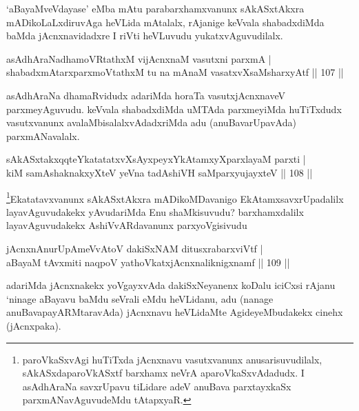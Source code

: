 \begin{artha}
`aBayaMveVdayase' eMba mAtu parabarxhamxvanunx sAkASxtAkxra mADikoLaLxdiruvAga heVLida mAtalalx, rAjanige keVvala shabadxdiMda baMda jAcnxnavidadxre I riVti heVLuvudu yukatxvAguvudilalx.
\end{artha}

\begin{shl}
asAdhAraNadhamoVRtathxM vijAcnxnaM vasutxni parxmA |\\
shabadxmAtarxparxmoVtathxM tu na mAnaM vasatxvXsaMsharxyAtf \hfill || 107 || 
\end{shl}

\begin{artha}
asAdhAraNa dhamaRvidudx adariMda horaTa vasutxjAcnxnaveV parxmeyAguvudu. keVvala shabadxdiMda uMTAda parxmeyiMda huTiTxdudx vasutxvanunx avalaMbisalalxvAdadxriMda adu (anuBavarUpavAda) parxmANavalalx.
\end{artha}

\begin{shl}
sAkASxtakxqqteYkatatatxvXsAyxpeyxYkAtamxyXparxlayaM parxti |\\
kiM samAshaknakxyXteV yeVna tadAshiVH saMparxyujayxteV \hfill || 108 || 
\end{shl}

\begin{artha}
\footnote{paroVkaSxvAgi huTiTxda jAcnxnavu vasutxvanunx anusarisuvudilalx, sAkASxdaparoVkASxtf barxhamx neVrA aparoVkaSxvAdadudx. I asAdhAraNa savxrUpavu tiLidare adeV anuBava parxtayxkaSx parxmANavAguvudeMdu tAtapxyaR.}Ekatatavxvanunx sAkASxtAkxra mADikoMDavanigo EkAtamxsavxrUpadalilx layavAguvudakekx yAvudariMda Enu shaMkisuvudu? barxhamxdalilx layavAguvudakekx AshiVvARdavanunx parxyoVgisivudu
\end{artha}

\begin{shl}
jAcnxnAnurUpAmeVvAtoV dakiSxNAM ditusxrabarxviVtf |\\
aBayaM tAvxmiti naqpoV yathoVkatxjAcnxnaliknigxnamf \hfill || 109 || 
\end{shl}

\begin{artha}
adariMda jAcnxnakekx yoVgayxvAda dakiSxNeyanenx koDalu iciCxsi rAjanu `ninage aBayavu baMdu seVrali eMdu heVLidanu, adu (nanage anuBavapayARMtaravAda) jAcnxnavu heVLidaMte AgideyeMbudakekx cinehx (jAcnxpaka).
\end{artha}


